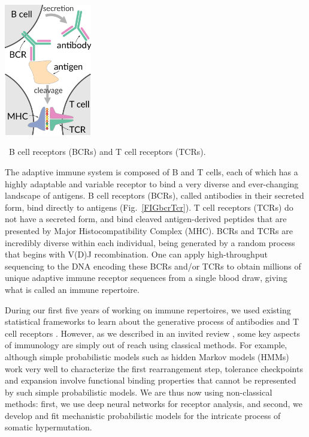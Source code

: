 \documentclass[nobib]{tufte-handout}
\begin{document}
\begin{marginfigure}[0.5in]%
\begin{centering}
  \includegraphics[width=1.5in]{bcr-tcr}
\end{centering}
  \caption{\
    B cell receptors (BCRs) and T cell receptors (TCRs).
    }
  \label{FIGbcrTcr}
\end{marginfigure}%

The adaptive immune system is composed of B and T cells, each of which has a highly adaptable and variable receptor to bind a very diverse and ever-changing landscape of antigens.
B cell receptors (BCRs), called antibodies in their secreted form, bind directly to antigens (Fig.~\ref{FIGbcrTcr}).
T cell receptors (TCRs) do not have a secreted form, and bind cleaved antigen-derived peptides that are presented by Major Histocompatibility Complex (MHC).
BCRs and TCRs are incredibly diverse within each individual, being generated by a random process that begins with V(D)J recombination.
One can apply high-throughput sequencing to the DNA encoding these BCRs and/or TCRs to obtain millions of unique adaptive immune receptor sequences from a single blood draw, giving what is called an immune repertoire.

During our first five years of working on immune repertoires, we used existing statistical frameworks to learn about the generative process of antibodies and T cell receptors \cite{McCoy2015-qi, Ralph2016-kr, Ralph2016-yl, Ralph2017-ih, DeWitt2018-el, Dhar2018-ne, Zhang2018-gn, Davidsen2018-gn, DeWitt2018-ar, Simonich2019-nn, Feng2019-sj, Dhar2019-qg}.
However, as we described in an invited review \cite{Olson2018-lw}, some key aspects of immunology are simply out of reach using classical methods.
For example, although simple probabilistic models such as hidden Markov models (HMMs) work very well to characterize the first rearrangement step, tolerance checkpoints and expansion involve functional binding properties that cannot be represented by such simple probabilistic models.
We are thus now using non-classical methods:
first, we use deep neural networks for receptor analysis, and second, we develop and fit mechanistic probabilistic models for the intricate process of somatic hypermutation.
\end{document}
